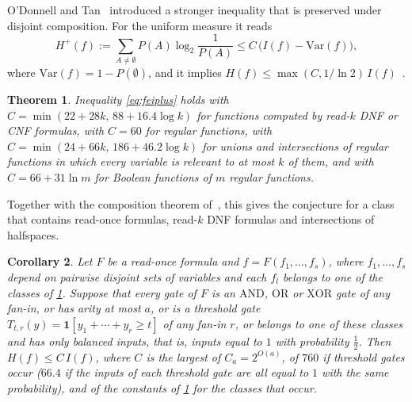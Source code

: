 \documentclass[11pt]{amsart}
\newtheorem{theorem}{Theorem}[section]
\newtheorem{corollary}[theorem]{Corollary}
\theoremstyle{definition}
\theoremstyle{remark}
\newcommand{\Var}{\mathrm{Var}}
\begin{document}
O'Donnell and Tan~\cite{OT13} introduced a stronger inequality that is preserved under disjoint composition. For
the uniform measure it reads
\begin{equation}\label{eq:feiplus}
H^+(f):=\sum_{A\ne\emptyset}P(A)\log_2\frac1{P(A)}\le C\,\bigl(I(f)-\Var(f)\bigr),
\end{equation}
where $\Var(f)=1-P(\emptyset)$, and it implies $H(f)\le\max(C,1/\ln2)\,I(f)$~\cite[Proposition~2.1]{OT13}.

\begin{theorem}\label{thm:plus-intro}
Inequality \eqref{eq:feiplus} holds with $C=\min(22+28k,\,88+16.4\log k)$ for functions computed by read-$k$ DNF or CNF formulas, with
$C=60$ for regular functions, with $C=\min(24+66k,\,186+46.2\log k)$ for unions and intersections of regular functions in which every
variable is relevant to at most $k$ of them, and with $C=66+31\ln m$ for Boolean functions of $m$ regular functions.
\end{theorem}

Together with the composition theorem of~\cite{OT13}, this gives the conjecture for a class that contains read-once
formulas, read-$k$ DNF formulas and intersections of halfspaces.

\begin{corollary}\label{cor:compose-intro}
Let $F$ be a read-once formula and $f=F(f_1,\dots,f_s)$, where $f_1,\dots,f_s$ depend on pairwise disjoint sets of
variables and each $f_l$ belongs to one of the classes of \cref{thm:plus-intro}. Suppose that every gate of $F$ is an
$\mathrm{AND}$, $\mathrm{OR}$ or $\mathrm{XOR}$ gate of any fan-in, or has arity at most $a$, or is a threshold gate
$T_{t,r}(y)=\mathbf 1[y_1+\cdots+y_r\ge t]$ of any fan-in $r$, or belongs to one of these classes and has only
balanced inputs, that is, inputs equal to $1$ with probability $\frac12$. Then $H(f)\le C\,I(f)$, where $C$ is the
largest of $C_a=2^{O(a)}$, of $760$ if threshold gates occur ($66.4$ if the inputs of each threshold gate are all
equal to $1$ with the same probability), and of the constants of \cref{thm:plus-intro} for the classes that occur.
\end{corollary}
\end{document}
